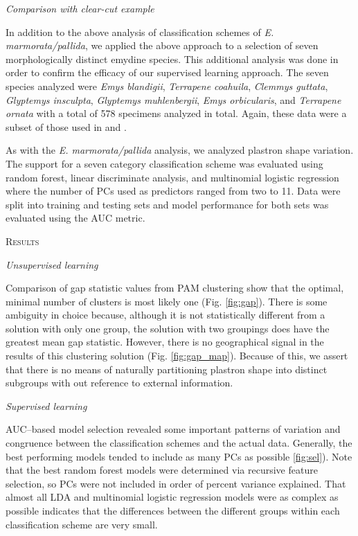 \documentclass[12pt,letterpaper]{article}
\renewcommand{\section}[1]{%
\bigskip
\begin{center}
\begin{Large}
\normalfont\scshape #1
\medskip
\end{Large}
\end{center}}
\renewcommand{\subsection}[1]{%
\bigskip
\begin{center}
\begin{large}
\normalfont\itshape #1
\end{large}
\end{center}}
\begin{document}
\subsection{Comparison with clear-cut example}
In addition to the above analysis of classification schemes of \textit{E. marmorata/pallida}, we applied the above approach to a selection of seven morphologically distinct emydine species. This additional analysis was done in order to confirm the efficacy of our supervised learning approach. The seven species analyzed were \textit{Emys blandigii}, \textit{Terrapene coahuila}, \textit{Clemmys guttata}, \textit{Glyptemys insculpta}, \textit{Glyptemys muhlenbergii}, \textit{Emys orbicularis}, and \textit{Terrapene ornata} with a total of 578 specimens analyzed in total. Again, these data were a subset of those used in \citet{Angielczyk2011} and \citet{Angielczyk2013a}.

As with the \textit{E. marmorata/pallida} analysis, we analyzed plastron shape variation. The support for a seven category classification scheme was evaluated using random forest, linear discriminate analysis, and multinomial logistic regression where the number of PCs used as predictors ranged from two to 11. Data were split into training and testing sets and model performance for both sets was evaluated using the AUC metric.


\section{Results}

\subsection{Unsupervised learning}
Comparison of gap statistic values from PAM clustering show that the optimal, minimal number of clusters is most likely one (Fig. \ref{fig:gap}). There is some ambiguity in choice because, although it is not statistically different from a solution with only one group, the solution with two groupings does have the greatest mean gap statistic. However, there is no geographical signal in the results of this clustering solution (Fig. \ref{fig:gap_map}). Because of this, we assert that there is no means of naturally partitioning plastron shape into distinct subgroups with out reference to external information.

\subsection{Supervised learning}
AUC--based model selection revealed some important patterns of variation and congruence between the classification schemes and the actual data. Generally, the best performing models tended to include as many PCs as possible \ref{fig:sel}). Note that the best random forest models were determined via recursive feature selection, so PCs were not included in order of percent variance explained. That almost all LDA and multinomial logistic regression models were as complex as possible indicates that the differences between the different groups within each classification scheme are very small.
\end{document}
